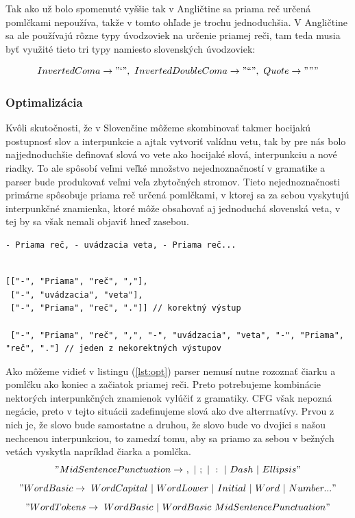 \documentclass[12pt,a4paper]{report}
\theoremstyle{definition}
\theoremstyle{remark}
\begin{document}
Tak ako už bolo spomenuté vyššie tak v Angličtine sa priama reč určená pomlčkami nepoužíva, takže v tomto ohľade je trochu jednoduchšia. V Angličtine sa ale používajú rôzne typy úvodzoviek na určenie priamej reči, tam teda musia byť využité tieto tri typy namiesto slovenských úvodzoviek:

$$InvertedComa \to "\text{`}", \ InvertedDoubleComa \to"\text{``}", \  Quote \to """$$

\subsubsection{Optimalizácia}
Kvôli skutočnosti, že v Slovenčine môžeme skombinovať takmer hocijakú postupnosť slov a interpunkcie a ajtak vytvoriť valídnu vetu, tak by pre nás bolo najjednoduchšie definovať slová vo vete ako hocijaké slová, interpunkciu a nové riadky. To ale spôsobí veľmi veľké množstvo nejednoznačností v gramatike a parser bude produkovať veľmi veľa zbytočných stromov. Tieto nejednoznačnosti primárne spôsobuje priama reč určená pomlčkami, v ktorej sa za sebou vyskytujú interpunkčné znamienka, ktoré môže obsahovať aj jednoduchá slovenská veta, v tej by sa však nemali objaviť hneď zasebou.
\begin{lstlisting}[caption={Nejednoznačný vstup},style=htmlcssjs]
- Priama reč, - uvádzacia veta, - Priama reč...
\end{lstlisting}
\begin{lstlisting}[caption={Výstupné vety vo forme polí},style=htmlcssjs, label={lst:opt}]

[["-", "Priama", "reč", ","],
 ["-", "uvádzacia", "veta"],
 ["-", "Priama", "reč", "."]] // korektný výstup
 
 ["-", "Priama", "reč", ",", "-", "uvádzacia", "veta", "-", "Priama", "reč", "."] // jeden z nekorektných výstupov
\end{lstlisting}
Ako môžeme vidieť v listingu (\ref{lst:opt}) parser nemusí nutne rozoznať čiarku a pomlčku ako koniec a začiatok priamej reči. Preto potrebujeme kombinácie nektorých interpunkčných znamienok vylúčiť z gramatiky. CFG však nepozná negácie, preto v tejto situácii zadefinujeme slová ako dve alterrnatívy. Prvou z nich je, že slovo bude samostatne a druhou, že slovo bude vo dvojici s našou nechcenou interpunkciou, to zamedzí tomu, aby sa priamo za sebou v bežných vetách vyskytla napríklad čiarka a pomlčka.
$$"MidSentencePunctuation \to \ , \ | \ ; \ | \ : \ | \ Dash \  | \ Ellipsis"$$
$$"WordBasic \to  \ WordCapital \ | \ WordLower \ | \ Initial \ | \ Word \ | \ Number ..."$$
$$"WordTokens  \to\  WordBasic \ | \ WordBasic \ MidSentencePunctuation"$$
\end{document}
